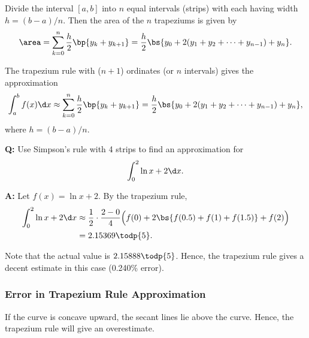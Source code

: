 Divide the interval $[a, b]$ into $n$ equal intervals (strips) with each having width $h = (b-a)/n$. Then the area of the $n$ trapeziums is given by \[\area = \sum_{k = 0}^n \frac{h}{2} \bp{y_k + y_{k+1}} = \frac{h}{2} \bs{y_0 + 2(y_1 + y_2 + \dots + y_{n-1}) + y_n}.\]

\begin{recipe}
    The trapezium rule with ($n+1$) ordinates (or $n$ intervals) gives the approximation \[\int_a^b f(x) \d x \approx \sum_{k = 0}^n \frac{h}{2} \bp{y_k + y_{k+1}} = \frac{h}{2} \bs{y_0 + 2(y_1 + y_2 + \dots + y_{n-1}) + y_n},\] where $h = (b-a)/n$.
\end{recipe}

\begin{example}
    \phantom{.}

    \textbf{Q:} Use Simpson's rule with 4 strips to find an approximation for \[\int_0^2 \ln{x + 2} \d x.\]
    
    \textbf{A:} Let $f(x) = \ln{x+2}$. By the trapezium rule,
    \begin{align*}
        \int_0^2 \ln{x + 2} \d x &\approx \frac{1}{2} \cdot \frac{2 - 0}{4} \Big(f(0) + 2\bs{f(0.5) + f(1) + f(1.5)} + f(2)\Big) \\
        &= 2.15369 \todp{5}.
    \end{align*}

    Note that the actual value is $2.15888 \todp{5}$. Hence, the trapezium rule gives a decent estimate in this case (0.240\% error).
\end{example}

\subsubsection{Error in Trapezium Rule Approximation}

If the curve is concave upward, the secant lines lie above the curve. Hence, the trapezium rule will give an overestimate.

\begin{figure}[H]
    \centering
    \caption{}
\end{figure}

